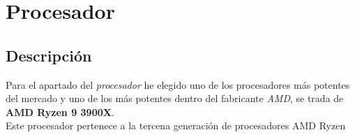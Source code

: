 \documentclass{article}
\begin{document}
      \section{Procesador}
        \subsection{Descripción}
          Para el apartado del \textit{procesador} he elegido uno de los procesadores más potentes del mercado y uno de los más potentes dentro del fabricante \textit{AMD}, se trada de \textbf{AMD Ryzen 9 3900X}.
          \\
          Este procesador pertenece a la tercena generación de procesadores AMD Ryzen

          
\end{document}
